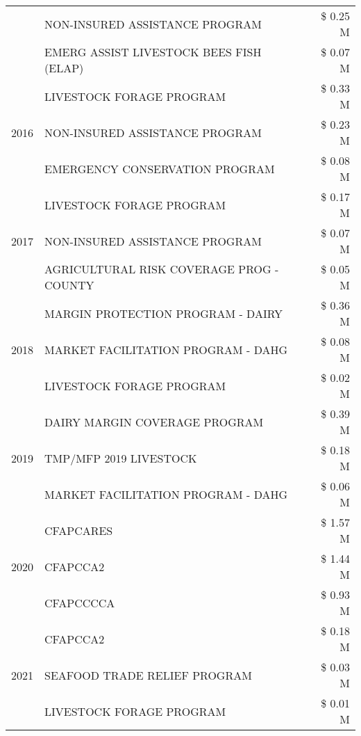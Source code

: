 \begin{tabular}{llr}
 & NON-INSURED ASSISTANCE PROGRAM & \$ 0.25 M \\
 & EMERG ASSIST LIVESTOCK BEES FISH (ELAP) & \$ 0.07 M \\
\cline{1-3}
\multirow[t]{3}{*}{2016} & LIVESTOCK FORAGE PROGRAM                      & \$ 0.33 M \\
 & NON-INSURED ASSISTANCE PROGRAM                & \$ 0.23 M \\
 & EMERGENCY CONSERVATION PROGRAM                & \$ 0.08 M \\
\cline{1-3}
\multirow[t]{3}{*}{2017} & LIVESTOCK FORAGE PROGRAM & \$ 0.17 M \\
 & NON-INSURED ASSISTANCE PROGRAM & \$ 0.07 M \\
 & AGRICULTURAL RISK COVERAGE PROG - COUNTY & \$ 0.05 M \\
\cline{1-3}
\multirow[t]{3}{*}{2018} & MARGIN PROTECTION PROGRAM - DAIRY & \$ 0.36 M \\
 & MARKET FACILITATION PROGRAM - DAHG & \$ 0.08 M \\
 & LIVESTOCK FORAGE PROGRAM & \$ 0.02 M \\
\cline{1-3}
\multirow[t]{3}{*}{2019} & DAIRY MARGIN COVERAGE PROGRAM & \$ 0.39 M \\
 & TMP/MFP 2019 LIVESTOCK & \$ 0.18 M \\
 & MARKET FACILITATION PROGRAM - DAHG & \$ 0.06 M \\
\cline{1-3}
\multirow[t]{3}{*}{2020} & CFAPCARES & \$ 1.57 M \\
 & CFAPCCA2 & \$ 1.44 M \\
 & CFAPCCCCA & \$ 0.93 M \\
\cline{1-3}
\multirow[t]{3}{*}{2021} & CFAPCCA2 & \$ 0.18 M \\
 & SEAFOOD TRADE RELIEF PROGRAM & \$ 0.03 M \\
 & LIVESTOCK FORAGE PROGRAM & \$ 0.01 M \\
\cline{1-3}
\bottomrule
\end{tabular}
